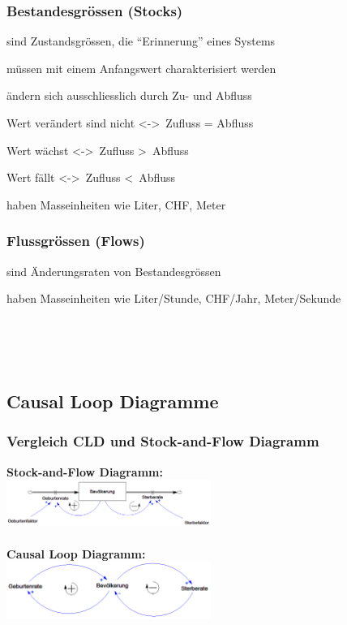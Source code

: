 \begin{multicols}{2}
	\subsubsection{Bestandesgrössen (Stocks)}
	\begin{compactitem}
		\item sind Zustandsgrössen, die “Erinnerung” eines Systems
		\item müssen mit einem Anfangswert charakterisiert werden
		\item ändern sich ausschliesslich durch Zu- und Abfluss
		\item Wert verändert sind nicht \textless-\textgreater\ Zufluss = Abfluss
		\item Wert wächst \textless-\textgreater\ Zufluss \textgreater\ Abfluss
		\item Wert fällt \textless-\textgreater\ Zufluss \textless\ Abfluss
		\item haben Masseinheiten wie Liter, CHF, Meter
	\end{compactitem}
	
	\subsubsection{Flussgrössen (Flows)}
	\begin{compactitem}
		\item sind Änderungsraten von Bestandesgrössen
		\item haben Masseinheiten wie Liter/Stunde, CHF/Jahr, Meter/Sekunde
	\end{compactitem} \ \\ \ \\ \ \\
\end{multicols}

\subsection{Causal Loop Diagramme}
\subsubsection{Vergleich CLD und Stock-and-Flow Diagramm}
\begin{multicols}{2}
	\textbf{Stock-and-Flow Diagramm:} \\
	\includegraphics[width=0.5\textwidth]{pictures/vergleich_stock} \\ \\
	\textbf{Causal Loop Diagramm:} \\
	\includegraphics[width=0.5\textwidth]{pictures/vergleich_cld} 
\end{multicols}	

